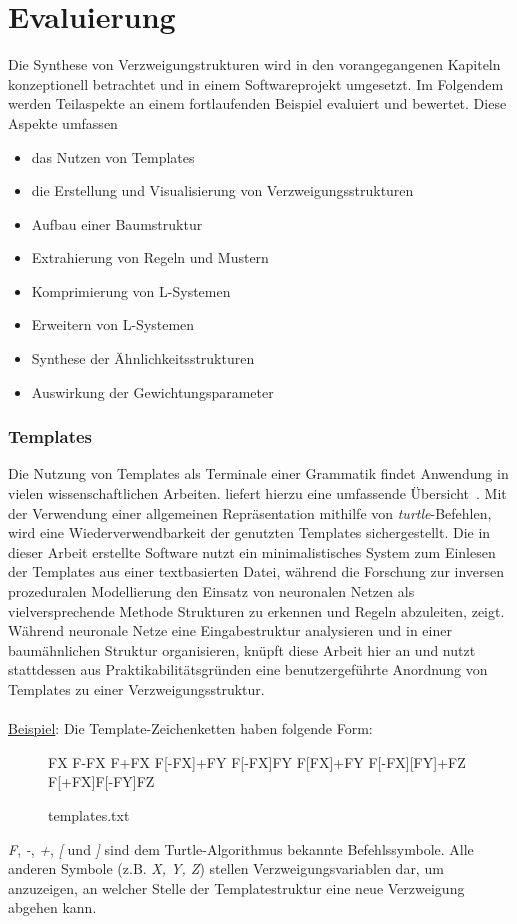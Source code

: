 
\chapter{Evaluierung}
Die Synthese von Verzweigungstrukturen wird in den vorangegangenen Kapiteln konzeptionell betrachtet
und in einem Softwareprojekt umgesetzt.
Im Folgendem werden Teilaspekte an einem fortlaufenden Beispiel evaluiert und bewertet.
Diese Aspekte umfassen
\begin{itemize}
    \item das Nutzen von Templates
    \item die Erstellung und Visualisierung von Verzweigungsstrukturen
    \item Aufbau einer Baumstruktur
    \item Extrahierung von Regeln und Mustern
    \item Komprimierung von L-Systemen
    \item Erweitern von L-Systemen
    \item Synthese der Ähnlichkeitsstrukturen
    \item Auswirkung der Gewichtungsparameter
\end{itemize}

\subsection*{Templates}
Die Nutzung von Templates als Terminale einer Grammatik findet Anwendung in vielen wissenschaftlichen Arbeiten.
\citeauthor{aliaga_2016} liefert hierzu eine umfassende Übersicht~\cite{aliaga_2016}.
Mit der Verwendung einer allgemeinen Repräsentation mithilfe von \textit{turtle}-Befehlen, wird eine
Wiederverwendbarkeit der genutzten Templates sichergestellt.
Die in dieser Arbeit erstellte Software nutzt ein minimalistisches System zum Einlesen der Templates aus
einer textbasierten Datei, während die Forschung zur inversen prozeduralen Modellierung den Einsatz von
neuronalen Netzen als vielversprechende Methode Strukturen zu erkennen und Regeln abzuleiten, zeigt.\\
Während neuronale Netze eine Eingabestruktur analysieren und in einer baumähnlichen Struktur organisieren,
knüpft diese Arbeit hier an und nutzt stattdessen aus Praktikabilitätsgründen eine benutzergeführte Anordnung
von Templates zu einer Verzweigungsstruktur.\\~\\
\underline{Beispiel}: Die Template-Zeichenketten haben folgende Form:
\begin{figure}[H]
    \centering
    \begin{csource}
    FX
    F-FX
    F+FX
    F[-FX]+FY
    F[-FX]FY
    F[FX]+FY
    F[-FX][FY]+FZ
    F[+FX]F[-FY]FZ
    \end{csource}
    \caption{templates.txt}
\end{figure}
\textit{F}, \textit{-}, \textit{+}, \textit{[} und \textit{]} sind dem Turtle-Algorithmus bekannte
Befehlssymbole.
Alle anderen Symbole (z.B. \textit{X, Y, Z}) stellen Verzweigungsvariablen dar, um anzuzeigen, an welcher Stelle
der Templatestruktur eine neue Verzweigung abgehen kann.

